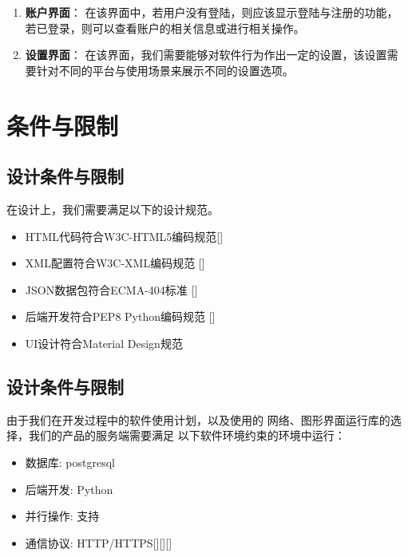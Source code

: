 \begin{enumerate}
{    }
    \item \textbf{账户界面}：
        在该界面中，若用户没有登陆，则应该显示登陆与注册的功能，
        若已登录，则可以查看账户的相关信息或进行相关操作。
    \item \textbf{设置界面}：
        在该界面，我们需要能够对软件行为作出一定的设置，该设置需要针对不同的平台与使用场景来展示不同的设置选项。
\end{enumerate}

\section{条件与限制}

\subsection{设计条件与限制} %

在设计上，我们需要满足以下的设计规范。

        \begin{itemize}
            \item HTML代码符合W3C-HTML5编码规范[\cite{hickson2011html5}]
            \item XML配置符合W3C-XML编码规范 [\cite{bray1997extensible}]
            \item JSON数据包符合ECMA-404标准 [\cite{bray2017javascript}]
            \item 后端开发符合PEP8 Python编码规范 [\cite{van2001pep}]
            \item UI设计符合Material Design规范
        \end{itemize}

\subsection{设计条件与限制} %

    由于我们在开发过程中的软件使用计划，以及使用的
    网络、图形界面运行库的选择，我们的产品的服务端需要满足
    以下软件环境约束的环境中运行：
    \begin{itemize}
        \item 数据库: postgresql
        \item 后端开发: Python
        \item 并行操作: 支持
        \item 通信协议: HTTP/HTTPS[\cite{berners1996hypertext}][\cite{fielding1999hypertext}][\cite{rescorla2000http}]
    \end{itemize}

